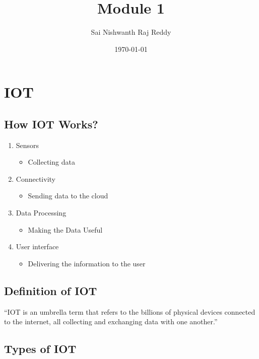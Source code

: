 \documentclass[11pt]{article}
\author{Sai Nishwanth Raj Reddy}
\date{\today}
\title{Module 1}
\begin{document}
\maketitle
\tableofcontents


\section{IOT}
\label{sec:orgb897077}

\subsection{How IOT Works?}
\label{sec:org39c06b0}
\begin{enumerate}
\item Sensors
\begin{itemize}
\item Collecting data
\end{itemize}
\item Connectivity
\begin{itemize}
\item Sending data to the cloud
\end{itemize}
\item Data Processing
\begin{itemize}
\item Making the Data Useful
\end{itemize}
\item User interface
\begin{itemize}
\item Delivering the information to the user
\end{itemize}
\end{enumerate}

\subsection{Definition of IOT}
\label{sec:org542b5a7}
``IOT is an umbrella term that refers to the billions of physical devices connected
to the internet, all collecting and exchanging data with one another.''

\subsection{Types of IOT}
\label{sec:org67e83e0}
\end{document}

